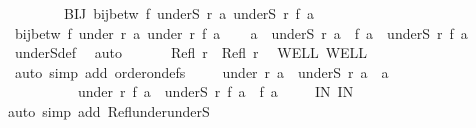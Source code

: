 \begin{isabellebody}
\ \ \ \ \ \ \ \ BIJ{\isacharcolon}{\kern0pt}\ {\isachardoublequoteopen}bij{\isacharunderscore}{\kern0pt}betw\ f\ {\isacharparenleft}{\kern0pt}underS\ r\ a{\isacharparenright}{\kern0pt}\ {\isacharparenleft}{\kern0pt}underS\ r{\isacharprime}{\kern0pt}\ {\isacharparenleft}{\kern0pt}f\ a{\isacharparenright}{\kern0pt}{\isacharparenright}{\kern0pt}{\isachardoublequoteclose}\isanewline
{}\ {\isachardoublequoteopen}bij{\isacharunderscore}{\kern0pt}betw\ f\ {\isacharparenleft}{\kern0pt}under\ r\ a{\isacharparenright}{\kern0pt}\ {\isacharparenleft}{\kern0pt}under\ r{\isacharprime}{\kern0pt}\ {\isacharparenleft}{\kern0pt}f\ a{\isacharparenright}{\kern0pt}{\isacharparenright}{\kern0pt}{\isachardoublequoteclose}\isanewline
%
\isadelimproof
%
\endisadelimproof
%
\isatagproof
{}\isamarkupfalse%
{\isacharminus}{\kern0pt}\isanewline
\ \ \isamarkupfalse%
\ {\isachardoublequoteopen}a\ {\isasymnotin}\ underS\ r\ a\ {\isasymand}\ f\ a\ {\isasymnotin}\ underS\ r{\isacharprime}{\kern0pt}\ {\isacharparenleft}{\kern0pt}f\ a{\isacharparenright}{\kern0pt}{\isachardoublequoteclose}\isanewline
\ \ \isamarkupfalse%
\ underS{\isacharunderscore}{\kern0pt}def\ \isamarkupfalse%
\ auto\isanewline
\ \ \isamarkupfalse%
\isanewline
\ \ \isacommand{{\isacharbraceleft}{\kern0pt}}\isamarkupfalse%
\isamarkupfalse%
\ {\isachardoublequoteopen}Refl\ r\ {\isasymand}\ Refl\ r{\isacharprime}{\kern0pt}{\isachardoublequoteclose}\ \isamarkupfalse%
\ WELL\ WELL{\isacharprime}{\kern0pt}\isanewline
\ \ \ \isamarkupfalse%
\ {\isacharparenleft}{\kern0pt}auto\ simp\ add{\isacharcolon}{\kern0pt}\ order{\isacharunderscore}{\kern0pt}on{\isacharunderscore}{\kern0pt}defs{\isacharparenright}{\kern0pt}\isanewline
\ \ \ \isamarkupfalse%
\ {\isachardoublequoteopen}under\ r\ a\ {\isacharequal}{\kern0pt}\ underS\ r\ a\ {\isasymunion}\ {\isacharbraceleft}{\kern0pt}a{\isacharbraceright}{\kern0pt}\ {\isasymand}\isanewline
\ \ \ \ \ \ \ \ \ \ under\ r{\isacharprime}{\kern0pt}\ {\isacharparenleft}{\kern0pt}f\ a{\isacharparenright}{\kern0pt}\ {\isacharequal}{\kern0pt}\ underS\ r{\isacharprime}{\kern0pt}\ {\isacharparenleft}{\kern0pt}f\ a{\isacharparenright}{\kern0pt}\ {\isasymunion}\ {\isacharbraceleft}{\kern0pt}f\ a{\isacharbraceright}{\kern0pt}{\isachardoublequoteclose}\isanewline
\ \ \ \isamarkupfalse%
\ IN\ IN{\isacharprime}{\kern0pt}\ \isamarkupfalse%
{\isacharparenleft}{\kern0pt}auto\ simp\ add{\isacharcolon}{\kern0pt}\ Refl{\isacharunderscore}{\kern0pt}under{\isacharunderscore}{\kern0pt}underS{\isacharparenright}{\kern0pt}\isanewline

\end{isabellebody}
